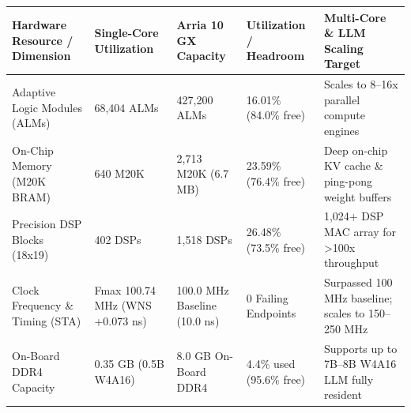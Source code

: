 \documentclass[11pt,a4paper]{article}
\begin{document}
{\footnotesize\renewcommand{\arraystretch}{1.14}\begin{longtable}{@{}L{0.21\textwidth}L{0.16\textwidth}L{0.16\textwidth}L{0.15\textwidth}L{0.22\textwidth}@{}}\toprule

\textbf{Hardware Resource /\allowbreak{} Dimension} & \textbf{Single-Core Utilization} & \textbf{Arria 10 GX Capacity} & \textbf{Utilization /\allowbreak{} Headroom} & \textbf{Multi-Core \& LLM Scaling Target}\\\midrule\endhead

Adaptive Logic Modules (\allowbreak{}ALMs)\allowbreak{} & 68,\allowbreak{}404 ALMs & 427,\allowbreak{}200 ALMs & 16.01\% (\allowbreak{}84.0\% free)\allowbreak{} & Scales to 8--16x parallel compute engines\\[2pt]

On-Chip Memory (\allowbreak{}M20K BRAM)\allowbreak{} & 640 M20K & 2,\allowbreak{}713 M20K (\allowbreak{}6.7 MB)\allowbreak{} & 23.59\% (\allowbreak{}76.4\% free)\allowbreak{} & Deep on-chip KV cache \& ping-pong weight buffers\\[2pt]

Precision DSP Blocks (\allowbreak{}18x19)\allowbreak{} & 402 DSPs & 1,\allowbreak{}518 DSPs & 26.48\% (\allowbreak{}73.5\% free)\allowbreak{} & 1,\allowbreak{}024+\allowbreak{} DSP MAC array for >100x throughput\\[2pt]

Clock Frequency \& Timing (\allowbreak{}STA)\allowbreak{} & Fmax 100.74 MHz (\allowbreak{}WNS +\allowbreak{}0.073 ns)\allowbreak{} & 100.0 MHz Baseline (\allowbreak{}10.0 ns)\allowbreak{} & 0 Failing Endpoints & Surpassed 100 MHz baseline; scales to 150--250 MHz\\[2pt]

On-Board DDR4 Capacity & 0.35 GB (\allowbreak{}0.5B W4A16)\allowbreak{} & 8.0 GB On-Board DDR4 & 4.4\% used (\allowbreak{}95.6\% free)\allowbreak{} & Supports up to 7B--8B W4A16 LLM fully resident\\[2pt]

\bottomrule\end{longtable}}
\end{document}
